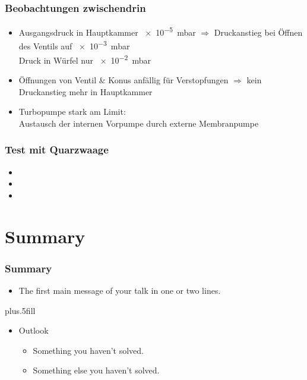 \documentclass{beamer}
\begin{document}
\begin{frame}
\frametitle{Beobachtungen zwischendrin}
\begin{itemize}\setlength{\itemsep}{+15pt}
  \item Ausgangsdruck in Hauptkammer \SI{e-5}{mbar} $\Rightarrow$ Druckanstieg bei Öffnen des
  Ventils auf \SI{e-3}{mbar}\\
  Druck in Würfel nur \SI{e-2}{mbar}
  \item Öffnungen von Ventil $\&$ Konus anfällig für Verstopfungen $\Rightarrow$ kein Druckanstieg
  mehr in Hauptkammer
  \item Turbopumpe stark am Limit:\\
  Austausch der internen Vorpumpe durch externe Membranpumpe
\end{itemize}
\end{frame}

\begin{frame}
\frametitle{Test mit Quarzwaage}
\begin{itemize}\setlength{\itemsep}{+15pt}
  \item 
  \item 
  \item 
\end{itemize}
\end{frame}




\section*{Summary}

\begin{frame}
\frametitle<presentation>{Summary}

\begin{itemize}
  \item The \alert{first main message} of your talk in one or two lines.
\end{itemize}




\vskip0pt plus.5fill
\begin{itemize}
  \item Outlook
  \begin{itemize}
    \item Something you haven't solved.
    \item Something else you haven't solved.
  \end{itemize}
\end{itemize}
\end{frame}
\end{document}
